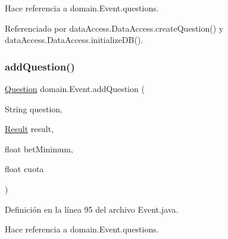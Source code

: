 Hace referencia a domain.\+Event.\+questions.



Referenciado por data\+Access.\+Data\+Access.\+create\+Question() y data\+Access.\+Data\+Access.\+initialize\+D\+B().

\mbox{\label{classdomain_1_1Event_a3eaf7a3d45a8c285684e4434ea3d91b0}} 
\subsubsection{\texorpdfstring{addQuestion()}{addQuestion()}\hspace{0.1cm}{\footnotesize\ttfamily [2/2]}}
{\footnotesize\ttfamily \mbox{\hyperlink{classdomain_1_1Question}{Question}} domain.\+Event.\+add\+Question (\begin{DoxyParamCaption}\item[{String}]{question,  }\item[{\mbox{\hyperlink{classdomain_1_1Result}{Result}}}]{result,  }\item[{float}]{bet\+Minimum,  }\item[{float}]{cuota }\end{DoxyParamCaption})}



Definición en la línea 95 del archivo Event.\+java.


\begin{DoxyCode}{0}

\end{DoxyCode}


Hace referencia a domain.\+Event.\+questions.

\mbox{\label{classdomain_1_1Event_ad41c734db360bd942b9028ddbefc77d2}} 
